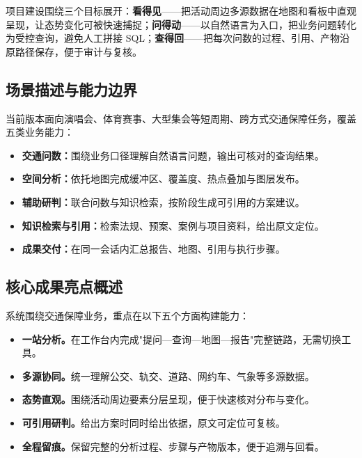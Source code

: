 \documentclass[a4paper,11pt]{article}
\newcommand{\term}[1]{\textbf{#1}}
\begin{document}
项目建设围绕三个目标展开：\term{看得见}——把活动周边多源数据在地图和看板中直观呈现，让态势变化可被快速捕捉；\term{问得动}——以自然语言为入口，把业务问题转化为受控查询，避免人工拼接 SQL；\term{查得回}——把每次问数的过程、引用、产物沿原路径保存，便于审计与复核。

\subsection{场景描述与能力边界}

当前版本面向演唱会、体育赛事、大型集会等短周期、跨方式交通保障任务，覆盖五类业务能力：

\begin{itemize}
  \item \term{交通问数：}围绕业务口径理解自然语言问题，输出可核对的查询结果。
  \item \term{空间分析：}依托地图完成缓冲区、覆盖度、热点叠加与图层发布。
  \item \term{辅助研判：}联合问数与知识检索，按阶段生成可引用的方案建议。
  \item \term{知识检索与引用：}检索法规、预案、案例与项目资料，给出原文定位。
  \item \term{成果交付：}在同一会话内汇总报告、地图、引用与执行步骤。
\end{itemize}

\subsection{核心成果亮点概述}

系统围绕交通保障业务，重点在以下五个方面构建能力：

\begin{itemize}
  \item \term{一站分析。}在工作台内完成"提问—查询—地图—报告"完整链路，无需切换工具。
  \item \term{多源协同。}统一理解公交、轨交、道路、网约车、气象等多源数据。
  \item \term{态势直观。}围绕活动周边要素分层呈现，便于快速核对分布与变化。
  \item \term{可引用研判。}给出方案时同时给出依据，原文可定位可复核。
  \item \term{全程留痕。}保留完整的分析过程、步骤与产物版本，便于追溯与回看。
\end{itemize}

\end{document}
